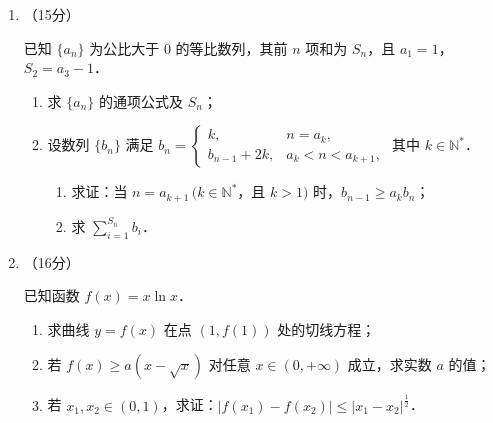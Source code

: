 \begin{description}
\begin{enumerate}[leftmargin=5pt]
        \item （15分）

        已知 $\{a_n\}$ 为公比大于 $0$ 的等比数列，其前 $n$ 项和为 $S_n$，且 $a_1=1$，$S_2=a_3-1$．

        \begin{enumerate}[label=(\arabic*)]
            \item 求 $\{a_n\}$ 的通项公式及 $S_n$；
            \item 设数列 $\{b_n\}$ 满足 $b_n=\begin{cases}k,&n=a_k,\\b_{n-1}+2k,&a_k<n<a_{k+1},\end{cases}$ 其中 $k\in\mathbb{N}^*$．
            \begin{enumerate}[label=\textcircled{\arabic*}]
                \item 求证：当 $n=a_{k+1}\,(k\in\mathbb{N}^*$，且 $k>1)$ 时，$b_{n-1}\geqslant a_kb_n$；
                \item 求 $\displaystyle\sum_{i=1}^{S_n}b_i$．
            \end{enumerate}
        \end{enumerate}

        \item （16分）

        已知函数 $f(x)=x\ln x$．

        \begin{enumerate}[label=(\arabic*)]
            \item 求曲线 $y=f(x)$ 在点 $(1,f(1))$ 处的切线方程；
            \item 若 $f(x)\geqslant a(x-\sqrt{x})$ 对任意 $x\in(0,+\infty)$ 成立，求实数 $a$ 的值；
            \item 若 $x_1,x_2\in(0,1)$，求证：$|f(x_1)-f(x_2)|\leqslant|x_1-x_2|^{\frac{1}{2}}$．
        \end{enumerate}
    \end{enumerate}
\end{description}
\clearpage

